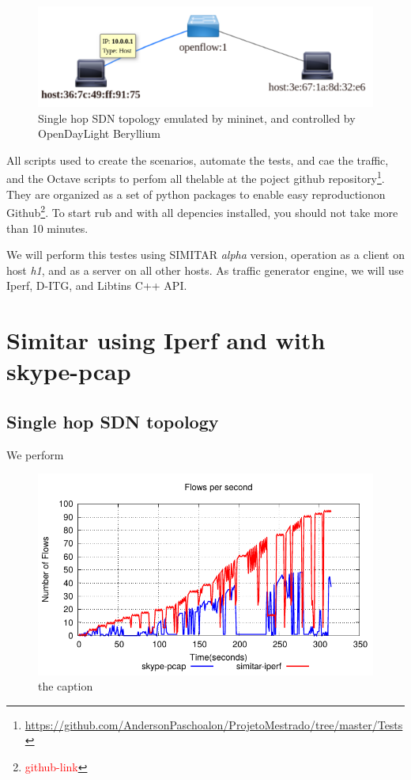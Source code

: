 \begin{figure}[!ht]
	\centering
	\includegraphics[scale=0.4]{figures/ch5/topo-simple}
	\caption{Single hop SDN topology emulated by mininet, and controlled by OpenDayLight Beryllium}
	\label{fig:topo-simple}
\end{figure}

All scripts used to create the scenarios, automate the tests, and cae the traffic, and the Octave scripts to perfom all thelable at the poject github repository\footnote{\href{https://github.com/AndersonPaschoalon/ProjetoMestrado/tree/master/Tests}{https://github.com/AndersonPaschoalon/ProjetoMestrado/tree/master/Tests}}. They are organized as a set of python packages to enable easy reproductionon Github\footnote{\textcolor{red}{github-link}}. To start rub and with all depencies installed, you should not take more than 10 minutes.

We will perform this testes using SIMITAR \textit{alpha} version, operation as a client on host \textit{h1}, and as a server on all other hosts. As traffic generator engine, we will use Iperf, D-ITG, and Libtins C++ API. 

\section{Simitar using Iperf and with skype-pcap}

\subsection{Single hop SDN topology}

We perform 


\begin{figure}[!ht]
	\centering
	\includegraphics[scale=0.75]{figures/ch5/iperfFlowsPs.pdf}
	\caption{the caption}
	\label{fig:iperfFlowsPs}
\end{figure}

